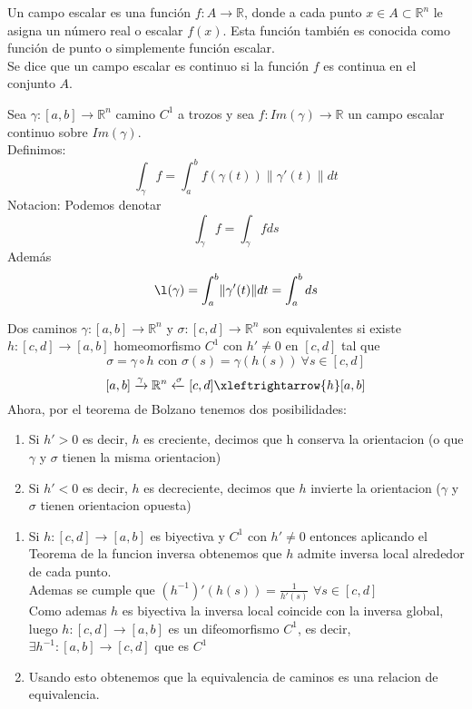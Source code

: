 \begin{definición} 
Un campo escalar es una función $f: A \to \mathbb{R}$, donde a cada punto $x \in A \subset \mathbb{R}^n$ le asigna un número real o escalar $f(x)$. Esta función también es conocida como función de punto o simplemente función escalar.\\
Se dice que un campo escalar es continuo si la función $f$ es continua en el conjunto $A$.
\end{definición}

\begin{definición} 
Sea $\gamma : [a,b] \to \mathbb{R}^n$ camino $C^1$ a trozos y sea $f:Im(\gamma) \to \mathbb{R}$ un campo escalar continuo sobre $Im(\gamma)$.\\
Definimos:
$$ \int_{\gamma} f = \int_{a}^{b} f(\gamma(t)) \lVert \gamma'(t) \rVert dt$$
Notacion: Podemos denotar $$\int_{\gamma} f = \int_{\gamma} f ds$$
Además
$$\l(\gamma) = \int_{a}^{b} \lVert \gamma'(t) \rVert dt = \int_{a}^{b} ds$$
\end{definición}

\begin{definición} 
Dos caminos $\gamma: [a,b] \to \mathbb{R}^n$ y $\sigma:[c,d] \to \mathbb{R}^n$ son equivalentes si existe $h:[c,d] \to [a,b]$ homeomorfismo $C^1$ con $h' \neq 0$ en $[c,d]$ tal que
$$\sigma = \gamma \circ h \text{ con } \sigma(s) = \gamma(h(s)) \ \forall s \in [c,d]$$
$$[a,b] \xrightarrow{\gamma} \mathbb{R}^n \xleftarrow{\sigma}[c,d] \xleftrightarrow{h} [a,b]$$
Ahora, por el teorema de Bolzano tenemos dos posibilidades:
\begin{enumerate}
    \item Si $h'>0$ es decir, $h$ es creciente, decimos que h conserva la orientacion (o
          que $\gamma$ y $\sigma$ tienen la misma orientacion)
    \item Si $h'<0$ es decir, $h$ es decreciente, decimos que $h$ invierte la orientacion
          ($\gamma$ y $\sigma$ tienen orientacion opuesta)
\end{enumerate}
\end{definición}

\begin{observación}
\vspace{-2.5em}
\begin{enumerate}
    \item Si $h:[c,d] \to [a,b]$ es biyectiva y $C^1$ con $h' \neq 0$ entonces aplicando
          el Teorema de la funcion inversa obtenemos que $h$ admite inversa local
          alrededor de cada punto. \\ Ademas se cumple que $(h^{-1})'(h(s)) =
              \frac{1}{h'(s)}$ $\forall s \in [c,d]$ \\ Como ademas $h$ es biyectiva la
          inversa local coincide con la inversa global, luego $h:[c,d] \to [a,b]$ es un
          difeomorfismo $C^1$, es decir, $\exists h^{-1}:[a,b] \to [c,d]$ que es $C^1$
    \item Usando esto obtenemos que la equivalencia de caminos es una relacion de
          equivalencia.
\end{enumerate}
\end{observación}

